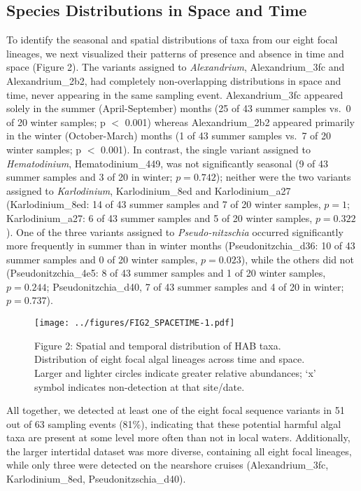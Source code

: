 \documentclass[
]{article}
\begin{document}
\hypertarget{species-distributions-in-space-and-time-1}{%
\subsection{Species Distributions in Space and
Time}\label{species-distributions-in-space-and-time-1}}

To identify the seasonal and spatial distributions of taxa from our
eight focal lineages, we next visualized their patterns of presence and
absence in time and space (Figure 2). The variants assigned to
\emph{Alexandrium}, Alexandrium\_3fc and Alexandrium\_2b2, had
completely non-overlapping distributions in space and time, never
appearing in the same sampling event. Alexandrium\_3fc appeared solely
in the summer (April-September) months (25 of 43 summer samples vs.~0 of
20 winter samples; p \(<\) 0.001) whereas Alexandrium\_2b2 appeared
primarily in the winter (October-March) months (1 of 43 summer samples
vs.~7 of 20 winter samples; p \(<\) 0.001). In contrast, the single
variant assigned to \emph{Hematodinium}, Hematodinium\_449, was not
significantly seasonal (9 of 43 summer samples and 3 of 20 in winter;
\(p = 0.742\)); neither were the two variants assigned to
\emph{Karlodinium}, Karlodinium\_8ed and Karlodinium\_a27
(Karlodinium\_8ed: 14 of 43 summer samples and 7 of 20 winter samples,
\(p = 1\); Karlodinium\_a27: 6 of 43 summer samples and 5 of 20 winter
samples, \(p = 0.322\)). One of the three variants assigned to
\emph{Pseudo-nitzschia} occurred significantly more frequently in summer
than in winter months (Pseudonitzchia\_d36: 10 of 43 summer samples and
0 of 20 winter samples, \(p = 0.023\)), while the others did not
(Pseudonitzchia\_4e5: 8 of 43 summer samples and 1 of 20 winter samples,
\(p = 0.244\); Pseudonitzchia\_d40, 7 of 43 summer samples and 4 of 20
in winter; \(p = 0.737\)).

\begin{figure}
\centering
\texttt{[image: ../figures/FIG2\_SPACETIME-1.pdf]}
\caption{Figure 2: Spatial and temporal distribution of HAB taxa.
Distribution of eight focal algal lineages across time and space. Larger
and lighter circles indicate greater relative abundances; `x' symbol
indicates non-detection at that site/date.}
\end{figure}

All together, we detected at least one of the eight focal sequence
variants in 51 out of 63 sampling events (81\%), indicating that these
potential harmful algal taxa are present at some level more often than
not in local waters. Additionally, the larger intertidal dataset was
more diverse, containing all eight focal lineages, while only three were
detected on the nearshore cruises (Alexandrium\_3fc, Karlodinium\_8ed,
Pseudonitzschia\_d40).
\end{document}
